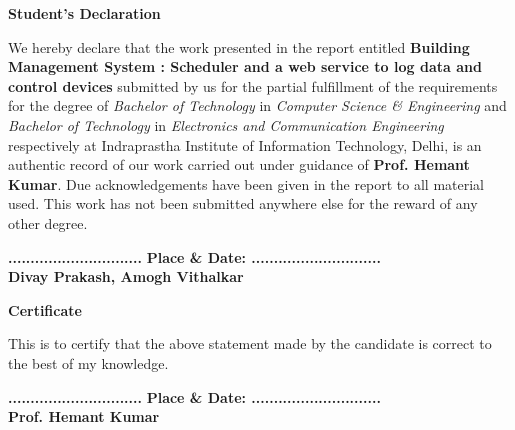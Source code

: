 \documentclass[letterpaper,11pt]{report}
\def\title{Building Management System : Scheduler and a web service to log data and control devices}
\begin{document}


\newpage
\setcounter{page}{2}
\begin{center}
\textbf{\Large Student's Declaration}\label{section:declaration}
\end{center}
We hereby declare that the work presented in the report entitled \textbf{\title{}} submitted by us for the partial fulfillment of the requirements for the degree of \emph{Bachelor of Technology} in \emph{Computer Science \& Engineering} and \emph{Bachelor of Technology} in \emph{Electronics and Communication Engineering} respectively at Indraprastha Institute of Information Technology, Delhi, is an authentic record of our work carried out under guidance of \textbf{Prof. Hemant Kumar}. Due acknowledgements have  been given in the report to all material used. This work has not been submitted anywhere else for the reward of any other degree.\\
\vspace{0.5in}

\textbf{..............................}\hfill
\textbf{ Place \& Date: .............................}\\
\textbf{Divay Prakash, Amogh Vithalkar}

\vspace{3in}
\begin{center}
\textbf{\Large Certificate} \label{section:certificate}
\end{center}
This is to certify that the above statement made by the candidate is correct to the best of my knowledge.\\
\vspace{0.4in}

\textbf{..............................}\hfill
\textbf{ Place \& Date: .............................}\\
\textbf{Prof. Hemant Kumar}

\pagebreak

\begin{abstract}
The building management HVAC(heating, ventilation and air conditioning) system for Phase II of IIIT-Delhi campus is designed to take care (and advantage) of diversity of use. Instead of using large AHUs(Air Handling Units), we will have individual units in faculty rooms, labs, and other spaces. This would allow us to condition air of the spaces that are occupied and the system would be able to maintain desired temperature more closely. The disadvantage of this approach is higher capital cost and a larger I/O points for BMS but the running cost will be saved. In this project we are developing a scheduler hosted on a web server to control the AC’s valves connected through Raspberry Pi and Arduino.
\par
\vspace{2.15in}
Keywords: building management system, scheduler, web server 
\end{abstract}
\end{document}
